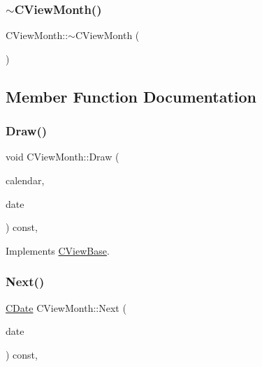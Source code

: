 \subsubsection{\texorpdfstring{$\sim$\+C\+View\+Month()}{~CViewMonth()}}
{\footnotesize\ttfamily C\+View\+Month\+::$\sim$\+C\+View\+Month (\begin{DoxyParamCaption}{ }\end{DoxyParamCaption})\hspace{0.3cm}{\ttfamily [default]}}



\subsection{Member Function Documentation}
\mbox{\label{class_c_view_month_acfed5c2bd785ee77f5528539a46f743c}} 
\subsubsection{\texorpdfstring{Draw()}{Draw()}}
{\footnotesize\ttfamily void C\+View\+Month\+::\+Draw (\begin{DoxyParamCaption}\item[{const \mbox{\hyperlink{class_c_calendar}{C\+Calendar}} \&}]{calendar,  }\item[{const \mbox{\hyperlink{class_c_date}{C\+Date}} \&}]{date }\end{DoxyParamCaption}) const\hspace{0.3cm}{\ttfamily [override]}, {\ttfamily [virtual]}}



Implements \mbox{\hyperlink{class_c_view_base_a10a44a3680cc7ba6cd42ed99d128ed22}{C\+View\+Base}}.

\mbox{\label{class_c_view_month_a61677174b4ffadff768792deeef52b5e}} 
\subsubsection{\texorpdfstring{Next()}{Next()}}
{\footnotesize\ttfamily \mbox{\hyperlink{class_c_date}{C\+Date}} C\+View\+Month\+::\+Next (\begin{DoxyParamCaption}\item[{const \mbox{\hyperlink{class_c_date}{C\+Date}} \&}]{date }\end{DoxyParamCaption}) const\hspace{0.3cm}{\ttfamily [override]}, {\ttfamily [virtual]}}



